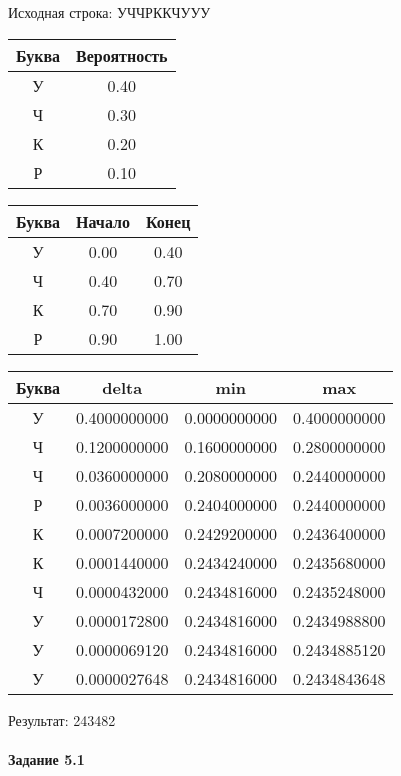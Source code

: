 \documentclass[a4paper, 12pt]{article}
\begin{document}
Исходная строка: УЧЧРККЧУУУ\
\begin{center}
 \begin{tabular}{ |c|c| } 
  \hline
     Буква & Вероятность \\ \hline
У & 0.40\\\hline
Ч & 0.30\\\hline
К & 0.20\\\hline
Р & 0.10
\\ \hline \end{tabular}
\end{center}
\begin{center}
 \begin{tabular}{ |c|c|c| } 
  \hline
     Буква & Начало & Конец \\ \hline
У & 0.00 & 0.40\\\hline
Ч & 0.40 & 0.70\\\hline
К & 0.70 & 0.90\\\hline
Р & 0.90 & 1.00
\\ \hline \end{tabular}
\end{center}
\begin{center}
 \begin{tabular}{ |c|c|c|c| } 
  \hline
     Буква & delta & min & max \\ \hline
У & 0.4000000000 & 0.0000000000 & 0.4000000000\\\hline
Ч & 0.1200000000 & 0.1600000000 & 0.2800000000\\\hline
Ч & 0.0360000000 & 0.2080000000 & 0.2440000000\\\hline
Р & 0.0036000000 & 0.2404000000 & 0.2440000000\\\hline
К & 0.0007200000 & 0.2429200000 & 0.2436400000\\\hline
К & 0.0001440000 & 0.2434240000 & 0.2435680000\\\hline
Ч & 0.0000432000 & 0.2434816000 & 0.2435248000\\\hline
У & 0.0000172800 & 0.2434816000 & 0.2434988800\\\hline
У & 0.0000069120 & 0.2434816000 & 0.2434885120\\\hline
У & 0.0000027648 & 0.2434816000 & 0.2434843648
\\ \hline \end{tabular}
\end{center}
Результат: 243482
\pagebreak
\paragraph{Задание 5.1}
\end{document}
